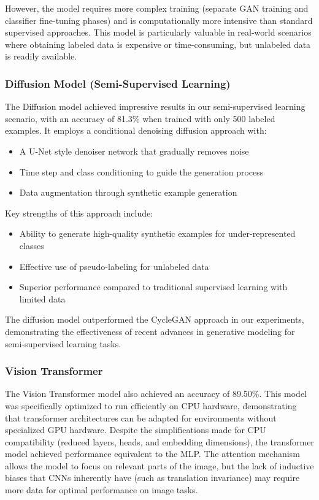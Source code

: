 \documentclass{article}
\begin{document}
However, the model requires more complex training (separate GAN training and classifier fine-tuning phases) and is computationally more intensive than standard supervised approaches. This model is particularly valuable in real-world scenarios where obtaining labeled data is expensive or time-consuming, but unlabeled data is readily available.

\subsubsection{Diffusion Model (Semi-Supervised Learning)}
The Diffusion model achieved impressive results in our semi-supervised learning scenario, with an accuracy of 81.3\% when trained with only 500 labeled examples. It employs a conditional denoising diffusion approach with:
\begin{itemize}
    \item A U-Net style denoiser network that gradually removes noise
    \item Time step and class conditioning to guide the generation process
    \item Data augmentation through synthetic example generation
\end{itemize}

Key strengths of this approach include:
\begin{itemize}
    \item Ability to generate high-quality synthetic examples for under-represented classes
    \item Effective use of pseudo-labeling for unlabeled data
    \item Superior performance compared to traditional supervised learning with limited data
\end{itemize}

The diffusion model outperformed the CycleGAN approach in our experiments, demonstrating the effectiveness of recent advances in generative modeling for semi-supervised learning tasks.

\subsubsection{Vision Transformer}
The Vision Transformer model also achieved an accuracy of 89.50\%. This model was specifically optimized to run efficiently on CPU hardware, demonstrating that transformer architectures can be adapted for environments without specialized GPU hardware. Despite the simplifications made for CPU compatibility (reduced layers, heads, and embedding dimensions), the transformer model achieved performance equivalent to the MLP. The attention mechanism allows the model to focus on relevant parts of the image, but the lack of inductive biases that CNNs inherently have (such as translation invariance) may require more data for optimal performance on image tasks.
\end{document}
